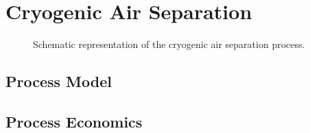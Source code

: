 \chapter{Cryogenic Air Separation}
\label{chp:cryo}

\begin{figure}
	
	\caption[Air Separation Unit]{Schematic representation of the cryogenic air separation process.}
	\label{fig:ASU}
\end{figure}

\section{Process Model}
\label{sec:asu_model}

\section{Process Economics}
\label{sec:uncertainty}

